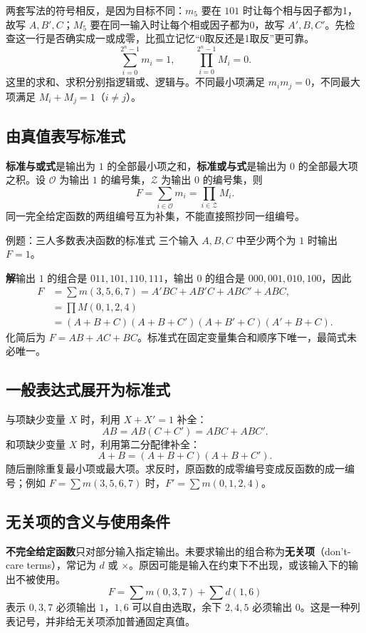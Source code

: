 \documentclass[UTF8,fontset=none,zihao=-4,a4paper]{ctexart}
\newcommand{\term}[1]{\textbf{#1}}
\newcommand{\sol}{\par\noindent\textbf{解}\quad}
\begin{document}
两套写法的符号相反，是因为目标不同：$m_5$ 要在 $101$ 时让每个相与因子都为1，故写 $A,B',C$；$M_5$ 要在同一输入时让每个相或因子都为0，故写 $A',B,C'$。先检查这一行是否确实成一或成零，比孤立记忆“0取反还是1取反”更可靠。
\[
\sum_{i=0}^{2^n-1}m_i=1,\qquad \prod_{i=0}^{2^n-1}M_i=0.
\]
这里的求和、求积分别指逻辑或、逻辑与。不同最小项满足 $m_i m_j=0$，不同最大项满足 $M_i+M_j=1$（$i\ne j$）。

\subsection{由真值表写标准式}
\term{标准与或式}是输出为 $1$ 的全部最小项之和，\term{标准或与式}是输出为 $0$ 的全部最大项之积。设 $\mathcal O$ 为输出 $1$ 的编号集，$\mathcal Z$ 为输出 $0$ 的编号集，则
\[
F=\sum_{i\in\mathcal O}m_i=\prod_{i\in\mathcal Z}M_i.
\]
同一完全给定函数的两组编号互为补集，不能直接照抄同一组编号。
\begin{infobox}{例题：三人多数表决函数的标准式}
三个输入 $A,B,C$ 中至少两个为 $1$ 时输出 $F=1$。
\end{infobox}
\sol 输出 $1$ 的组合是 $011,101,110,111$，输出 $0$ 的组合是 $000,001,010,100$，因此
\begin{align*}
F&=\sum m(3,5,6,7)=A'BC+AB'C+ABC'+ABC,\\
 &=\prod M(0,1,2,4)\\
 &=(A+B+C)(A+B+C')(A+B'+C)(A'+B+C).
\end{align*}
化简后为 $F=AB+AC+BC$。标准式在固定变量集合和顺序下唯一，最简式未必唯一。

\subsection{一般表达式展开为标准式}
与项缺少变量 $X$ 时，利用 $X+X'=1$ 补全：
\[
AB=AB(C+C')=ABC+ABC'.
\]
和项缺少变量 $X$ 时，利用第二分配律补全：
\[
A+B=(A+B+C)(A+B+C').
\]
随后删除重复最小项或最大项。求反时，原函数的成零编号变成反函数的成一编号；例如 $F=\sum m(3,5,6,7)$ 时，$F'=\sum m(0,1,2,4)$。

\subsection{无关项的含义与使用条件}
\term{不完全给定函数}只对部分输入指定输出。未要求输出的组合称为\term{无关项}（don't-care terms），常记为 $d$ 或 $\times$。原因可能是输入在约束下不出现，或该输入下的输出不被使用。
\[
F=\sum m(0,3,7)+\sum d(1,6)
\]
表示 $0,3,7$ 必须输出 $1$，$1,6$ 可以自由选取，余下 $2,4,5$ 必须输出 $0$。这是一种列表记号，并非给无关项添加普通固定真值。
\end{document}
